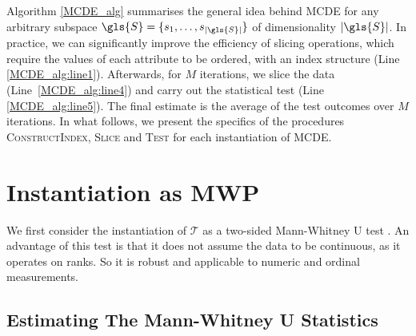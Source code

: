 Algorithm \ref{MCDE_alg} summarises the general idea behind \gls{MCDE} for any arbitrary subspace $\gls{S} = \{s_1, \dots, s_{|\gls{S}|}\}$ of dimensionality $|\gls{S}|$. 
In practice, we can significantly improve the efficiency of slicing operations, which require the values of each attribute to be ordered, with an index structure (Line \ref{MCDE_alg:line1}). Afterwards, for $M$ iterations, we slice the data (Line~\ref{MCDE_alg:line4}) and carry out the statistical test (Line \ref{MCDE_alg:line5}). %
The final estimate is the average of the test outcomes over $M$ iterations. In what follows, we present the specifics of the procedures \textsc{ConstructIndex}, \textsc{Slice} and \textsc{Test} for each instantiation of \gls{MCDE}. 

\section{Instantiation as \acrfull{MWP}}

We first consider the instantiation of $\mathcal{T}$ as a two-sided Mann-Whitney U test \cite{Mann1947}. %
An advantage of this test is that it does not assume the data to be continuous, as it operates on ranks. So it is robust and applicable to numeric and ordinal measurements.  

\subsection{Estimating The Mann-Whitney U Statistics} 

